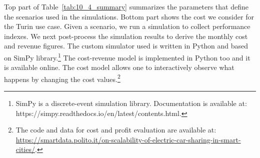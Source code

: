 Top part of Table~\ref{tab:10_4_summary} summarizes the parameters that define the scenarios used in the simulations. Bottom part shows the cost we consider for the Turin use case.
Given a scenario, we run a simulation to collect performance indexes. We next post-process the simulation results to derive the monthly cost and revenue figures. The custom simulator used is written in Python and based on SimPy library.\footnote{SimPy is a discrete-event simulation library. Documentation is available at: https://simpy.readthedocs.io/en/latest/contents.html.} The cost-revenue model is implemented in Python too and it is available online. The cost model allows one to interactively observe what happens by changing the cost values.\footnote{The code and data for cost and profit evaluation are available at: \url{https://smartdata.polito.it/on-scalability-of-electric-car-sharing-in-smart-cities/}.}

